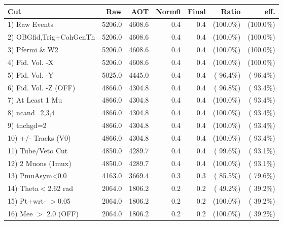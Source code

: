  \begin{table}[h!]\centering
 \begin{tabular}{||l||r|r|r|r|r|r||}
 \hline
 \hline
 Cut & Raw & AOT & Norm0 & Final & Ratio & eff.       \\
 \hline
  1) Raw Events           &       5206.0 &       4608.6 &          0.4 &          0.4 & (100.0\%) & (100.0\%) \\
  2) OBGfid,Trig+CohGenTh &       5206.0 &       4608.6 &          0.4 &          0.4 & (100.0\%) & (100.0\%) \\
  3) Pfermi \& W2         &       5206.0 &       4608.6 &          0.4 &          0.4 & (100.0\%) & (100.0\%) \\
  4) Fid. Vol. -X         &       5206.0 &       4608.6 &          0.4 &          0.4 & (100.0\%) & (100.0\%) \\
  5) Fid. Vol. -Y         &       5025.0 &       4445.0 &          0.4 &          0.4 & ( 96.4\%) & ( 96.4\%) \\
  6) Fid. Vol. -Z (OFF)   &       4866.0 &       4304.8 &          0.4 &          0.4 & ( 96.8\%) & ( 93.4\%) \\
  7) At Least 1 Mu        &       4866.0 &       4304.8 &          0.4 &          0.4 & (100.0\%) & ( 93.4\%) \\
  8) ncand=2,3,4          &       4866.0 &       4304.8 &          0.4 &          0.4 & (100.0\%) & ( 93.4\%) \\
  9) tnchgd=2             &       4866.0 &       4304.8 &          0.4 &          0.4 & (100.0\%) & ( 93.4\%) \\
 10) +/- Tracks (V0)      &       4866.0 &       4304.8 &          0.4 &          0.4 & (100.0\%) & ( 93.4\%) \\
 11) Tube/Veto Cut        &       4850.0 &       4289.7 &          0.4 &          0.4 & ( 99.6\%) & ( 93.1\%) \\
 12) 2 Muons (1mux)       &       4850.0 &       4289.7 &          0.4 &          0.4 & (100.0\%) & ( 93.1\%) \\
 13) PmuAsym<0.0          &       4163.0 &       3669.4 &          0.3 &          0.3 & ( 85.5\%) & ( 79.6\%) \\
 14) Theta$<$2.62 rad     &       2064.0 &       1806.2 &          0.2 &          0.2 & ( 49.2\%) & ( 39.2\%) \\
 15) Pt+wrt- $>$0.05      &       2064.0 &       1806.2 &          0.2 &          0.2 & (100.0\%) & ( 39.2\%) \\
 16) Mee $>$ 2.0  (OFF)   &       2064.0 &       1806.2 &          0.2 &          0.2 & (100.0\%) & ( 39.2\%) \\

\end{tabular}
\end{table}
